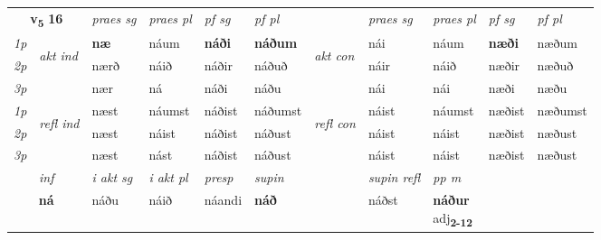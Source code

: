 \noindent
\begin{tabular}{lllllllllll} \toprule
\multicolumn{2}{c}{\textbf{v{\textsubscript{5}}} \Large{\textbf{16}}}  &  \textit{praes sg}  & \textit{praes pl}  &\textit{ pf sg} & \textit{pf pl} &  &  \textit{praes sg}  & \textit{praes pl}  & \textit{pf sg} & \textit{pf pl } \\*
	\cmidrule{3-6} \cmidrule{8-11}
 {\textit{1p}} & \multirow{3}{*}{\begin{turn}{90}\textit{akt ind}\end{turn}} & \textbf{næ} & náum & \textbf{náði} & \textbf{náðum} & \multirow{3}{*}{\begin{turn}{90}\textit{akt con}\end{turn}} &nái & náum & \textbf{næði} & næðum\\*
 {\textit{2p}} &  &  nærð  & náið & náðir & náðuð & & náir & náið & næðir & næðuð \\*
{\textit{3p}} &  & nær & ná & náði & náðu & & nái & nái& næði & næðu \\*
\cmidrule{3-6} \cmidrule{8-11}
 {\textit{1p}} & \multirow{3}{*}{\begin{turn}{90}\textit{refl ind}\end{turn}}  & næst & náumst & náðist & náðumst & \multirow{3}{*}{\begin{turn}{90}\textit{refl con}\end{turn}}  &náist & náumst & næðist & næðumst \\*
 {\textit{2p}} &  & næst & náist & náðist & náðust & &náist & náist & næðist & næðust \\*
 {\textit{3p}}  & & næst & nást & náðist & náðust & & náist & náist& næðist & næðust \\*
\cmidrule{3-6} \cmidrule{8-11}

   \multicolumn{2}{c}{\textit{inf}}  & \textit{i akt sg} & \textit{i akt pl}   & \textit{presp} & \textit{supin} && \textit{supin refl} & \textit{pp m} \\*
  \multicolumn{2}{c}{\textbf{ná}} & náðu  & náið   & náandi &  \textbf{náð} && náðst & \specialcell{\textbf{náður} \\ adj\textbf{\textsubscript{2-12}}} \\*
\end{tabular}

